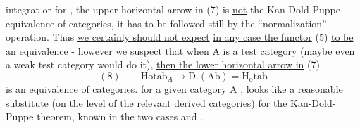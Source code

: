 
integrat or for \hand{$\Delta$}, the upper horizontal arrow in (7) is \uline{not} the
Kan-Dold-Puppe equivalence of categories, it has to be followed still
by the ``normalization'' operation. Thus \uline{we certainly should not expect} 
\uline{in any case the functor} (5) \uline{to be an equivalence} - \uline{however we suspect}
\uline{that when A is a test category} (maybe even a weak test category would
do it), \uline{then the lower horizontal arrow in} (7)
\[ (8) \qquad \mathrm{Hotab}_A \longrightarrow \mathrm{D.(Ab)} = \mathrm{H}_{\mathrm{o}}\mathrm{tab} \]
\uline{is an equivalence of categories}.   for a given
category A ,  looks like a reasonable substitute (on the level of the
relevant derived categories)  for the Kan-Dold-Puppe theorem, known
in the two cases \hand{$\Delta$} and \hand{\unsure{$\bigcirc$}}.

